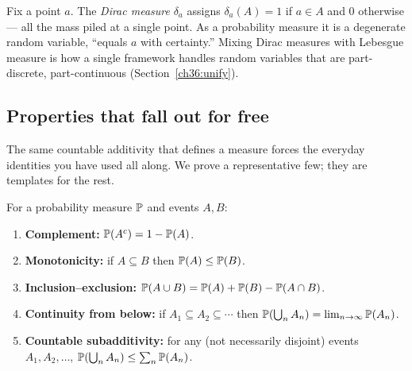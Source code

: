 \begin{example}
\label{ch36:dirac}
Fix a point $a$. The \emph{Dirac measure} $\delta_a$ assigns $\delta_a(A) = 1$ if
$a \in A$ and $0$ otherwise --- all the mass piled at a single point. As a
probability measure it is a degenerate random variable, ``equals $a$ with
certainty.'' Mixing Dirac measures with Lebesgue measure is how a single framework
handles random variables that are part-discrete, part-continuous
(Section~\ref{ch36:unify}).
\end{example}

\subsection{Properties that fall out for free}

The same countable additivity that defines a measure forces the everyday
identities you have used all along. We prove a representative few; they are
templates for the rest.

\begin{proposition}
\label{ch36:props}
For a probability measure $\P$ and events $A, B$:
\begin{enumerate}
  \item \textbf{Complement:} $\P(A^c) = 1 - \P(A)$.
  \item \textbf{Monotonicity:} if $A \subseteq B$ then $\P(A) \le \P(B)$.
  \item \textbf{Inclusion--exclusion:} $\P(A \cup B) = \P(A) + \P(B) - \P(A\cap B)$.
  \item \textbf{Continuity from below:} if $A_1 \subseteq A_2 \subseteq \cdots$
        then $\P\!\left(\bigcup_n A_n\right) = \lim_{n\to\infty} \P(A_n)$.
  \item \textbf{Countable subadditivity:} for any (not necessarily disjoint) events
        $A_1, A_2, \dots$, $\P\!\left(\bigcup_n A_n\right) \le \sum_n \P(A_n)$.
\end{enumerate}
\end{proposition}

